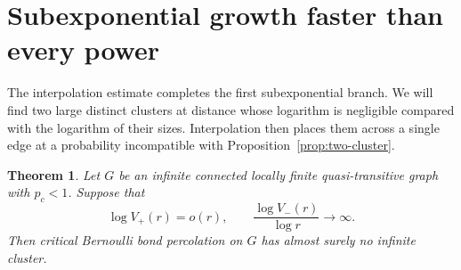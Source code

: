 \documentclass[11pt]{article}
\newtheorem{theorem}{Theorem}[section]
\theoremstyle{definition}
\newcommand{\pc}{p_c}
\begin{document}
\section{Subexponential growth faster than every power}
\label{sec:superpolynomial}

The interpolation estimate completes the first subexponential branch.
We will find two large distinct clusters at distance whose logarithm
is negligible compared with the logarithm of their sizes. Interpolation
then places them across a single edge at a probability incompatible
with Proposition~\ref{prop:two-cluster}.

\begin{theorem}\label{thm:superpoly}
Let $G$ be an infinite connected locally finite quasi-transitive graph
with $\pc<1$. Suppose that
\[
 \log V_+(r)=o(r),
 \qquad \frac{\log V_-(r)}{\log r}\longrightarrow\infty.
\]
Then critical Bernoulli bond percolation on $G$ has almost surely no
infinite cluster.
\end{theorem}
\end{document}
